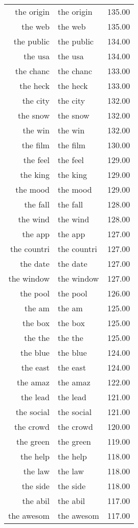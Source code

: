 \begin{table}[ht]
\begin{tabular}{rlr}
  the origin & the origin & 135.00 \\ 
  the web & the web & 135.00 \\ 
  the public & the public & 134.00 \\ 
  the usa & the usa & 134.00 \\ 
  the chanc & the chanc & 133.00 \\ 
  the heck & the heck & 133.00 \\ 
  the city & the city & 132.00 \\ 
  the snow & the snow & 132.00 \\ 
  the win & the win & 132.00 \\ 
  the film & the film & 130.00 \\ 
  the feel & the feel & 129.00 \\ 
  the king & the king & 129.00 \\ 
  the mood & the mood & 129.00 \\ 
  the fall & the fall & 128.00 \\ 
  the wind & the wind & 128.00 \\ 
  the app & the app & 127.00 \\ 
  the countri & the countri & 127.00 \\ 
  the date & the date & 127.00 \\ 
  the window & the window & 127.00 \\ 
  the pool & the pool & 126.00 \\ 
  the am & the am & 125.00 \\ 
  the box & the box & 125.00 \\ 
  the the & the the & 125.00 \\ 
  the blue & the blue & 124.00 \\ 
  the east & the east & 124.00 \\ 
  the amaz & the amaz & 122.00 \\ 
  the lead & the lead & 121.00 \\ 
  the social & the social & 121.00 \\ 
  the crowd & the crowd & 120.00 \\ 
  the green & the green & 119.00 \\ 
  the help & the help & 118.00 \\ 
  the law & the law & 118.00 \\ 
  the side & the side & 118.00 \\ 
  the abil & the abil & 117.00 \\ 
  the awesom & the awesom & 117.00 \\ 

\end{tabular}
\end{table}
